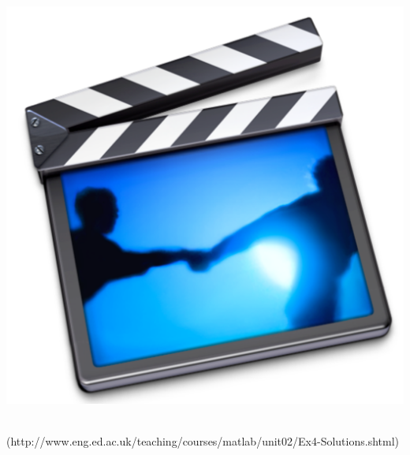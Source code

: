 {\begin{minipage}{\linewidth}
\begin{minipage}{6mm}
\includegraphics[scale=0.03]{Graphics/General/screencast_icon}
\end{minipage}
\href{http://www.eng.ed.ac.uk/teaching/courses/matlab/unit02/Ex4-Solutions.shtml}{}\\
(http://www.eng.ed.ac.uk/teaching/courses/matlab/unit02/Ex4-Solutions.shtml)
\end{minipage}%
}\\
\addtolength{\parindent}{4mm}

